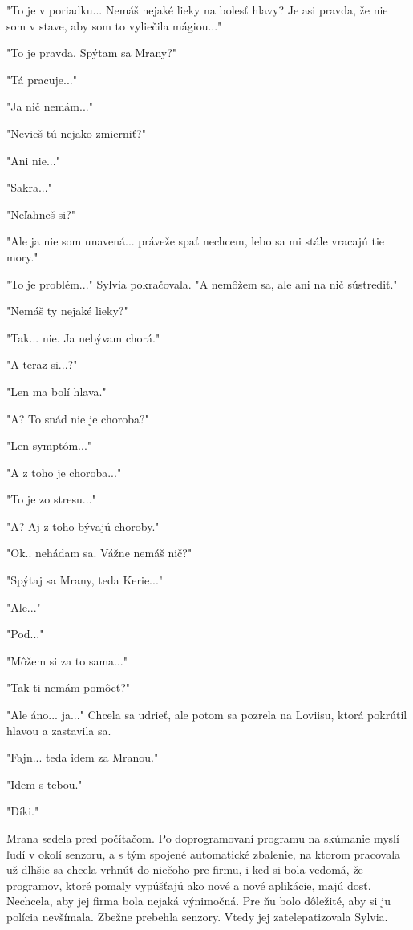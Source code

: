 \documentclass{book}
\begin{document}
"$ $To je v poriadku... Nemáš nejaké lieky na bolesť hlavy? Je asi pravda, že nie som v stave, aby som to vyliečila mágiou..."$ $ 

"$ $To je pravda. Spýtam sa Mrany?"$ $ 

"$ $Tá pracuje..."$ $ 

"$ $Ja nič nemám..."$ $ 

"$ $Nevieš tú nejako zmierniť?"$ $ 

"$ $Ani nie..."$ $ 

"$ $Sakra..."$ $ 

"$ $Neľahneš si?"$ $ 

"$ $Ale ja nie som unavená... práveže spať nechcem, lebo sa mi stále vracajú tie mory."$ $ 

"$ $To je problém..."$ $  Sylvia pokračovala. "$ $A nemôžem sa, ale ani na nič sústrediť."$ $ 

"$ $Nemáš ty nejaké lieky?"$ $ 

"$ $Tak... nie. Ja nebývam chorá."$ $ 

"$ $A teraz si...?"$ $ 

"$ $Len ma bolí hlava."$ $ 

"$ $A? To snáď nie je choroba?"$ $ 

"$ $Len symptóm..."$ $ 

"$ $A z toho je choroba..."$ $ 

"$ $To je zo stresu..."$ $ 

"$ $A? Aj z toho bývajú choroby."$ $ 

"$ $Ok.. nehádam sa. Vážne nemáš nič?"$ $ 

"$ $Spýtaj sa Mrany, teda Kerie..."$ $ 

"$ $Ale..."$ $ 

"$ $Poď..."$ $ 

"$ $Môžem si za to sama..."$ $ 

"$ $Tak ti nemám pomôcť?"$ $ 

"$ $Ale áno... ja..."$ $  Chcela sa udrieť, ale potom sa pozrela na Loviisu, ktorá pokrútil hlavou a zastavila sa.

"$ $Fajn... teda idem za Mranou."$ $ 

"$ $Idem s tebou."$ $ 

"$ $Díki."$ $ 

Mrana sedela pred počítačom. Po doprogramovaní programu na skúmanie myslí ľudí v okolí senzoru, a s tým spojené automatické zbalenie, na ktorom pracovala už dlhšie sa chcela vrhnúť do niečoho pre firmu, i keď si bola vedomá, že programov, ktoré pomaly vypúšťajú ako nové a nové aplikácie, majú dosť. Nechcela, aby jej firma bola nejaká výnimočná. Pre ňu bolo dôležité, aby si ju polícia nevšímala. Zbežne prebehla senzory. Vtedy jej zatelepatizovala Sylvia.
\end{document}
